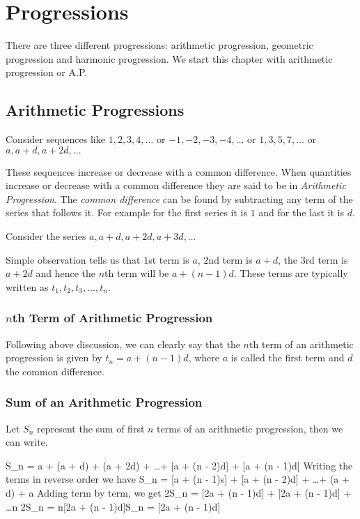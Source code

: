 \chapter{Progressions}
There are three different progressions: arithmetic progression, geometric progression and harmonic progression. We start this
chapter with arithmetic progression or A.P.

\section{Arithmetic Progressions}
Consider sequences like $1, 2, 3, 4, \ldots$ or $-1, -2, -3, -4, \ldots$ or $1, 3, 5, 7, \ldots$ or $a, a + d, a + 2d, \ldots$

These sequences increase or decrease with a common difference. When quantities increase or decrease with a common difference they
are said to be in {\it Arithmetic Progression}. The {\it common difference} can be found by subtracting any term of the
series that follows it. For example for the first series it is $1$ and for the last it is $d$.

Consider the series $a, a + d, a + 2d, a + 3d, \ldots$

Simple observation tells us that $1$st term is $a$, $2$nd term is $a + d$, the $3$rd term is $a + 2d$ and hence the $n$th term will
be $a + (n - 1)d$. These terms are typically written as $t_1, t_2, t_3, \ldots, t_n$.

\subsection{$n$th Term of Arithmetic Progression}
Following above discussion, we can clearly say that the $n$th term of an arithmetic progression is given by $t_n = a + (n - 1)d$,
where $a$ is called the first term and $d$ the common difference.

\subsection{Sum of an Arithmetic Progression}
Let $S_n$ represent the sum of first $n$ terms of an arithmetic progression, then we can write.

\startformula S_n = a + (a + d) + (a + 2d) + \ldots + [a + (n - 2)d] + [a + (n - 1)d]\stopformula
Writing the terms in reverse order we have
\startformula S_n = [a + (n - 1)s] + [a + (n - 2)d] + \ldots + (a + d) + a\stopformula
Adding term by term, we get
\startformula 2S_n = [2a + (n - 1)d] + [2a + (n - 1)d] + \ldots{}n\stopformula
\startformula 2S_n = n[2a + (n - 1)d]\Rightarrow S_n = [2a + (n - 1)d]\stopformula

